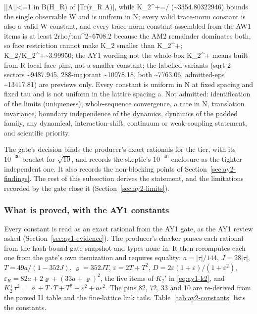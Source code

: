 \begin{gatequote}
||A||<=1 in B(H\_R) of |Tr(r\_R A)|, while K\_2\textasciicircum{}+=/ (\textasciitilde{}3354.80322946)
bounds the single observable W and is uniform in N; every valid trace-norm
constant is also a valid W constant, and every trace-norm constant assembled
from the AW1 items is at least
2rho/tau\textasciicircum{}2\textasciitilde{}6708.2 because the AM2 remainder
dominates both, so face restriction cannot make K\_2\textquotesingle{} smaller
than K\_2\textasciicircum{}+;
K\_2\textquotesingle{}/K\_2\textasciicircum{}+\textasciitilde{}3.99950; the
AY1 wording \textquotesingle{}not the whole-box
K\_2\textasciicircum{}+\textquotesingle{} means \textquotesingle{}built from
R-local face pins\textquotesingle{}, not a smaller constant; the labelled
variants (sqrt-2 sectors \textasciitilde{}9487.945, 288-majorant
\textasciitilde{}10978.18, both \textasciitilde{}7763.06, admitted-eps
\textasciitilde{}13417.81) are previews only. Every constant is uniform in N
at fixed spacing and fixed tau and is not uniform in the lattice spacing a.
Not admitted: identification of the limits (uniqueness), whole-sequence
convergence, a rate in N, translation invariance, boundary independence of the
dynamics, dynamics of the padded family, any dynamical, interaction-shift,
continuum or weak-coupling statement, and scientific priority.
\end{gatequote}
The gate's decision binds the producer's exact rationals for the tier, with
its $10^{-30}$ bracket for $\sqrt{10}$, and records the skeptic's $10^{-40}$
enclosure as the tighter independent one. It also records the non-blocking
points of Section~\ref{sec:ay2-findings}. The rest of this subsection derives
the statement, and the limitations recorded by the gate close it
(Section~\ref{sec:ay2-limits}).

\subsubsection{What is proved, with the AY1 constants}
\label{sec:ay2-statement}
Every constant is read as an exact rational from the AY1 gate, as the AY1
review asked (Section~\ref{sec:ay1-evidence}). The producer's checker parses
each rational from the hash-bound gate snapshot and types none in. It then
recomputes each one from the gate's own itemization and requires equality:
$a=|\tau|/144$, $J=28|\tau|$, $T=49a/(1-352J)$, $\varrho=352JT$,
$\varepsilon=2T+T^2$, $D=2\varepsilon(1+\varepsilon)/(1+\varepsilon^2)$,
$\varepsilon_R=82a+2\varrho+(33a+\varrho)^2$, the five items of $K_2'$ in
\eqref{eq:ay1-k2}, and
$K_2^+\tau^2=\varrho+T\cdot T+T^2+\varepsilon^2+a\varepsilon^2$. The pins 82,
72, 33 and 10 are re-derived from the parsed I1 table and the fine-lattice
link tails. Table~\ref{tab:ay2-constants} lists the constants.

